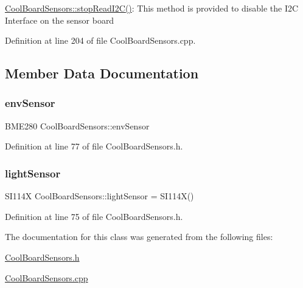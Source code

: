 \hyperlink{class_cool_board_sensors_ab67b900b9e5e7c18d52d2d9107ba171b}{Cool\+Board\+Sensors\+::stop\+Read\+I2\+C()}\+: This method is provided to disable the I2C Interface on the sensor board 

Definition at line 204 of file Cool\+Board\+Sensors.\+cpp.



\subsection{Member Data Documentation}
\mbox{\label{class_cool_board_sensors_a868e38985e9a2412829fa2790ca13e2e}} 
\subsubsection{\texorpdfstring{env\+Sensor}{envSensor}}
{\footnotesize\ttfamily B\+M\+E280 Cool\+Board\+Sensors\+::env\+Sensor}



Definition at line 77 of file Cool\+Board\+Sensors.\+h.

\mbox{\label{class_cool_board_sensors_a3e397300fb707dd193e909a757bf6102}} 
\subsubsection{\texorpdfstring{light\+Sensor}{lightSensor}}
{\footnotesize\ttfamily S\+I114X Cool\+Board\+Sensors\+::light\+Sensor = S\+I114X()}



Definition at line 75 of file Cool\+Board\+Sensors.\+h.



The documentation for this class was generated from the following files\+:\begin{DoxyCompactItemize}
\item 
\hyperlink{_cool_board_sensors_8h}{Cool\+Board\+Sensors.\+h}\item 
\hyperlink{_cool_board_sensors_8cpp}{Cool\+Board\+Sensors.\+cpp}\end{DoxyCompactItemize}
